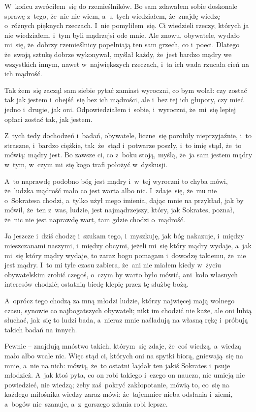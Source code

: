 \documentclass[a4paper,11pt]{article}
\begin{document}
W~końcu zwróciłem~się do rzemieślników. Bo sam zdawałem sobie
doskonale sprawę z~tego, że~nic nie wiem, a~u~tych wiedziałem,
że~znajdę wiedzę o~różnych pięknych rzeczach. I~nie pomyliłem~się. Ci
wiedzieli rzeczy, których ja nie wiedziałem, i~tym byli mądrzejsi ode
mnie. Ale znowu, obywatele, wydało mi~się, że~dobrzy rzemieślnicy
popełniają ten sam grzech, co i~poeci. Dlatego że~swoją sztukę dobrze
wykonywał, myślał każdy, że~jest bardzo mądry we wszystkich innym,
nawet w~największych rzeczach, i~ta ich wada rzucała cień na ich
mądrość.

Tak żem~się zaczął sam siebie pytać zamiast wyroczni, co bym wolał:
czy zostać tak jak jestem i~obejść~się bez ich mądrości, ale i~bez tej
ich głupoty, czy mieć jedno i~drugie, jak oni. Odpowiedziałem i~sobie,
i~wyroczni, że~mi~się lepiej opłaci zostać tak, jak jestem.

Z~tych tedy dochodzeń i~badań, obywatele, liczne~się porobiły
nieprzyjaźnie, i~to straszne, i~bardzo ciężkie, tak~że~stąd i~potwarze
poszły, i~to imię stąd, że~to mówią: mądry jest. Bo zawsze ci, co
z~boku stoją, myślą, że~ja sam jestem mądry w~tym, w~czym mi~się kogo
trafi położyć w~dyskusji.

A~to naprawdę podobno bóg jest mądry i~w~tej wyroczni to chyba mówi, że~ludzka mądrość mało co jest warta albo nic. I~zdaje~się, że~mu nie o~Sokratesa chodzi, a~tylko użył mego imienia, dając mnie na przykład, jak by mówił, że~ten z~was, ludzie, jest najmądrzejszy, który, jak Sokrates, poznał, że~nic nie jest naprawdę wart, tam gdzie chodzi o~mądrość.

Ja jeszcze i~dziś chodzę i~szukam tego, i~myszkuję, jak bóg nakazuje, i~między mieszczanami naszymi, i~między obcymi, jeżeli mi~się który mądry wydaje, a~jak mi~się który mądry wydaje, to zaraz bogu pomagam i~dowodzę takiemu, że~nie jest mądry. I~to mi tyle czasu zabiera, że~ani nie miałem kiedy w~życiu obywatelskim zrobić czegoś, o~czym by warto było mówić, ani~koło własnych interesów chodzić; ostatnią biedę klepię przez tę służbę bożą.

A~oprócz tego chodzą za mną młodzi ludzie, którzy najwięcej mają
wolnego czasu, synowie co najbogatszych obywateli; nikt im chodzić nie
każe, ale oni lubią słuchać, jak~się to ludzi bada, a~nieraz mnie
naśladują na własną rękę i~próbują takich badań na innych.

Pewnie -- znajdują mnóstwo takich, którym~się zdaje, że~coś wiedzą,
a~wiedzą mało albo wcale nic. Więc stąd ci, których oni na spytki
biorą, gniewają~się na mnie, a~nie na nich: mówią, że~to ostatni
łajdak ten jakiś Sokrates i~psuje młodzież. A~jak ktoś pyta, co on robi takiego i~czego on naucza, nie umieją nic powiedzieć, nie wiedzą; żeby zaś~pokryć zakłopotanie, mówią to, co~się na każdego miłośnika wiedzy zaraz mówi: że~tajemnice nieba odsłania i~ziemi, a~bogów nie~szanuje, a~z~gorszego zdania robi lepsze.
\end{document}
